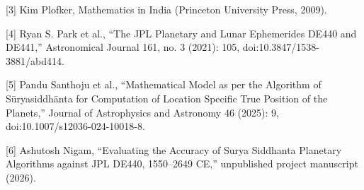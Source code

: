 \documentclass[
]{article}
\begin{document}
{[}3{]} Kim Plofker, Mathematics in India (Princeton University Press,
2009).

{[}4{]} Ryan S. Park et al., ``The JPL Planetary and Lunar Ephemerides
DE440 and DE441,'' Astronomical Journal 161, no. 3 (2021): 105,
doi:10.3847/1538-3881/abd414.

{[}5{]} Pandu Santhoju et al., ``Mathematical Model as per the Algorithm
of Sūryasiddhānta for Computation of Location Specific True Position of
the Planets,'' Journal of Astrophysics and Astronomy 46 (2025): 9,
doi:10.1007/s12036-024-10018-8.

{[}6{]} Ashutosh Nigam, ``Evaluating the Accuracy of Surya Siddhanta
Planetary Algorithms against JPL DE440, 1550--2649 CE,'' unpublished
project manuscript (2026).
\end{document}
